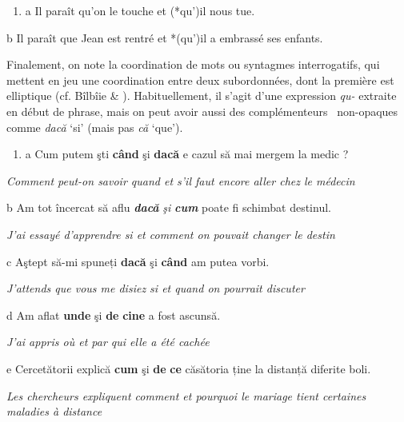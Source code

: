 \begin{enumerate}
\item \label{bkm:Ref273482378}a  Il paraît qu'on le touche et (*qu')il nous tue.


\end{enumerate}
  b  Il paraît que Jean est rentré et *(qu')il a embrassé ses enfants.  

Finalement, on note la coordination de mots ou syntagmes interrogatifs, qui mettent en jeu une coordination entre deux subordonnées, dont la première est elliptique (cf. Bîlbîie \& \citet{Gazdik2011}). Habituellement, il s'agit d'une expression \textit{qu-} extraite en début de phrase, mais on peut avoir aussi des complémenteurs {\guillemotleft}~non-opaques~{\guillemotright} comme \textit{dacă} `si' (mais pas \textit{că} `que').


\begin{enumerate}
\item a  Cum putem şti \textbf{când} şi \textbf{dacă} e cazul să mai mergem la medic ?


\end{enumerate}
{\itshape
Comment peut-on savoir quand et s'il faut encore aller chez le médecin}

  b  Am tot încercat să aflu \emph{\textbf{\textup{dacă}}}\emph{} \emph{\textup{şi}}\emph{} \emph{\textbf{\textup{cum}}} poate fi schimbat destinul. 

{\itshape
J'ai essayé d'apprendre si et comment on pouvait changer le destin}

  c  Aştept să-mi spuneți \textbf{dacă} şi \textbf{când} am putea vorbi.

{\itshape
J'attends que vous me disiez si et quand on pourrait discuter}

  d  Am aflat \textbf{unde} şi \textbf{de} \textbf{cine} a fost ascunsă.

{\itshape
J'ai appris où et par qui elle a été cachée}

  e  Cercetătorii explică \textbf{cum} şi \textbf{de} \textbf{ce} căsătoria ține la distanță diferite boli.

{\itshape
Les chercheurs expliquent comment et pourquoi le mariage tient certaines maladies à distance}

